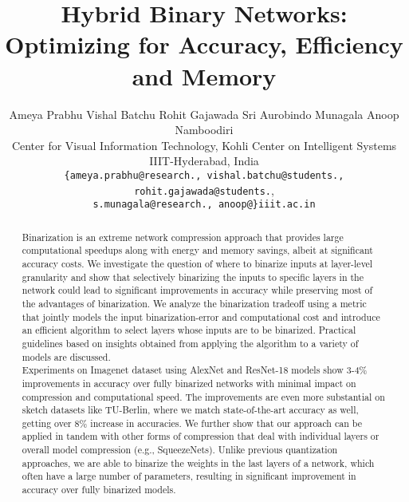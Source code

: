 \documentclass[10pt,twocolumn,letterpaper]{article}
\begin{document}
\title{Hybrid Binary Networks: Optimizing for Accuracy, Efficiency and Memory}

\author{Ameya Prabhu\quad
Vishal Batchu\quad
Rohit Gajawada\quad
Sri Aurobindo Munagala\quad
Anoop Namboodiri\\
Center for Visual Information Technology, Kohli Center on Intelligent Systems\\
IIIT-Hyderabad, India\\
{\tt\small \{ameya.prabhu@research., vishal.batchu@students., rohit.gajawada@students.},\\{\tt\small s.munagala@research., anoop@\}iiit.ac.in}}

\maketitle
\ifwacvfinal\thispagestyle{empty}\fi

\begin{abstract}
  \noindent Binarization is an extreme network compression approach that provides large computational speedups along with energy and memory savings, albeit at significant accuracy costs. We investigate the question of where to binarize inputs at layer-level granularity and show that selectively binarizing the inputs to specific layers in the network could lead to significant improvements in accuracy while preserving most of the advantages of binarization. We analyze the binarization tradeoff using a metric that jointly models the input binarization-error and computational cost and introduce an efficient algorithm to select layers whose inputs are to be binarized. Practical guidelines based on insights obtained from applying the algorithm to a variety of models are discussed.\\ Experiments on Imagenet dataset using AlexNet and ResNet-18 models show 3-4\% improvements in accuracy over fully binarized networks with minimal impact on compression and computational speed. The improvements are even more substantial on sketch datasets like TU-Berlin, where we match state-of-the-art accuracy as well, getting over 8\% increase in accuracies. We further show that our approach can be applied in tandem with other forms of compression that deal with individual layers or overall model compression (e.g., SqueezeNets). Unlike previous quantization approaches, we are able to binarize the weights in the last layers of a network, which often have a large number of parameters, resulting in significant improvement in accuracy over fully binarized models.
\end{abstract}
\end{document}
